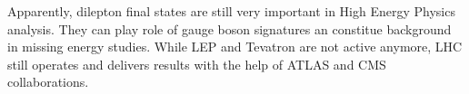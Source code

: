 \documentclass{article}
\begin{document}
Apparently, dilepton final states are still very important in High Energy Physics analysis. They can play role of gauge boson signatures an constitue background in missing energy studies. While LEP and Tevatron are not active anymore, LHC still operates and delivers results with the help of ATLAS and CMS collaborations.

\printbibliography{}
\end{document}
